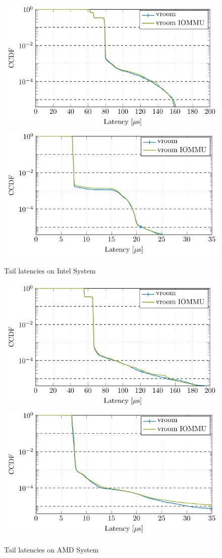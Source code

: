 \begin{figure}[H]
  \centering
   {\includegraphics[width=.70\textwidth]{figures/lats_ccdf_2MiB_qd1t1_read} \label{fig:ccdf-read}}
   {\includegraphics[width=.70\textwidth]{figures/lats_ccdf_2MiB_qd1t1} \label{fig:ccdf-write}}
  \caption{Tail latencies on Intel System}
  \label{fig:ccdf}
\end{figure}

\begin{figure}[H]
  \centering
   {\includegraphics[width=.70\textwidth]{figures/lats_ccdf_2MiB_qd1t1_read_epyc} \label{fig:ccdf-read-epyc}}
   {\includegraphics[width=.70\textwidth]{figures/lats_ccdf_2MiB_qd1t1_epyc} \label{fig:ccdf-write-epyc}}
  \caption{Tail latencies on AMD System}
  \label{fig:ccdf-epyc}
\end{figure}

